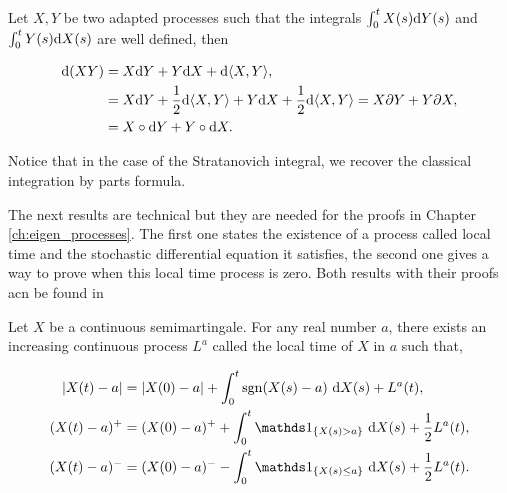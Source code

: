 \begin{theorem} \label{thm:partes} %
    Let $X, Y$ be two adapted processes such that the integrals $\int_0^t X(s) \mathrm d Y(s)$ and $\int_0^t Y(s) \mathrm d X(s)$ are well defined, then

    \begin{align*}
        \mathrm d(XY) &= X \mathrm d Y + Y \mathrm d X + \mathrm d \langle X, Y \rangle,\\
        &= X \mathrm d Y + \frac12 \mathrm d \langle X, Y \rangle + Y \mathrm d X + \frac12 \mathrm d \langle X, Y \rangle = X \partial Y + Y \partial X,\\  
        &= X \circ \mathrm d Y + Y \circ \mathrm d X.
    \end{align*}
\end{theorem}

Notice that in the case of the Stratanovich integral, we recover the classical integration by parts formula.



The next results are technical but they are needed for the proofs in Chapter \ref{ch:eigen_processes}. The first one states the existence of a process called local time and the stochastic differential equation it satisfies, the second one gives a way to prove when this local time process is zero. Both results with their proofs acn be found in \cite{book:revuzyor}


\begin{theorem}
    Let $X$ be a continuous semimartingale. For any real number $a$, there exists an increasing continuous process $L^a$ called the local time of $X$ in $a$ such that,


    \begin{align*}
        \abs{X(t) - a} &= \abs{X(0) - a} + \int_0^t \mathrm{sgn}(X(s) - a)~\d X(s) + L^a(t),\\
        (X(t) - a)^+ &= (X(0) - a)^+ + \int_0^t \mathds 1_{\{X(s) > a\}}~\d X(s) + \frac12 L^a(t),\\
        (X(t) - a)^- &= (X(0) - a)^- - \int_0^t \mathds 1_{\{X(s) \le a\}}~\d X(s) + \frac12 L^a(t).
    \end{align*}

\end{theorem}


